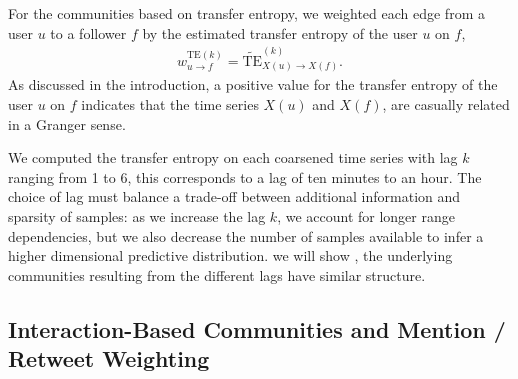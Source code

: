 \DIFdelend For the communities based on transfer entropy, we weighted each edge from a user $u$ to a follower $f$ by the estimated transfer entropy of the user $u$ on $f$, 
\begin{align}
	w_{u \to f}^{\text{TE}(k)} = \widetilde{\text{TE}}_{X(u) \to X(f)}^{(k)}. \label{Eqn-EW-activity}
\end{align}
As discussed in the introduction, a positive value for the transfer entropy of the user $u$ on $f$ indicates that \DIFdelbegin {}\DIFdelend the time series $X(u)$ and $X(f)$, are casually related in a Granger sense\DIFaddbegin {}\DIFaddend .

 We computed the transfer entropy on each coarsened time series with lag $k$ ranging from 1 to 6, this corresponds to a lag of ten minutes to an hour. The choice of lag must balance a trade-off between additional information and sparsity of samples: as we increase the lag $k$, we account for longer range dependencies, but we also decrease the number of samples available to infer a higher dimensional predictive distribution.  \DIFdelbegin {}\DIFdelend \DIFaddbegin {}\DIFaddend we will show \DIFaddbegin {}\DIFaddend , the underlying communities resulting from the different lags have similar structure.  \DIFaddbegin {}\DIFaddend 

\subsection{Interaction-Based Communities and Mention / Retweet Weighting}
\label{sec:method-interaction}

